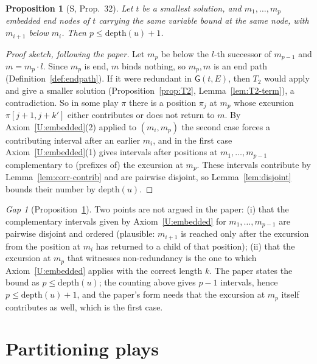 \documentclass[11pt]{article}
\newcommand{\depth}{\mathrm{depth}}
\newcommand{\Gm}{\mathsf{G}}
\newcommand{\suc}[2]{#1{\cdot}#2}
\newcommand{\iv}[2]{\pi[#1,#2]}
\theoremstyle{plain}
\newtheorem{proposition}[theorem]{Proposition}
\theoremstyle{definition}
\theoremstyle{remark}
\newtheorem{gap}{Gap}
\begin{document}
\begin{proposition}[S, Prop.~32]\label{prop:stacking}
Let $t$ be a smallest solution, and $m_1,\dots,m_p$ embedded end nodes of
$t$ carrying the same variable bound at the same node, with $m_{i+1}$
below $m_i$.  Then $p\le\depth(u)+1$.
\end{proposition}
\begin{proof}[Proof sketch, following the paper]
Let $m_p$ be below the $l$-th successor of $m_{p-1}$ and $m=\suc{m_p}l$.
Since $m_p$ is end, $m$ binds nothing, so $m_p,m$ is an end path
(Definition~\ref{def:endpath}).  If it were redundant in $\Gm(t,E)$, then
$T_2$ would apply and give a smaller solution
(Proposition~\ref{prop:T2}, Lemma~\ref{lem:T2-term}), a contradiction.
So in some play $\pi$ there is a position $\pi_j$ at $m_p$ whose
excursion $\iv{j+1}{j+k'}$ either contributes or does not return to $m$.
By Axiom~\ref{U:embedded}(2) applied to $(m_i,m_p)$ the second case
forces a contributing interval after an earlier $m_i$, and in the first
case Axiom~\ref{U:embedded}(1) gives intervals after positions at
$m_1,\dots,m_{p-1}$ complementary to (prefixes of) the excursion at
$m_p$.  These intervals contribute by Lemma~\ref{lem:corr-contrib} and
are pairwise disjoint, so Lemma~\ref{lem:disjoint} bounds their number by
$\depth(u)$.
\end{proof}

\begin{gap}[Proposition~\ref{prop:stacking}]\label{gap:stacking}
Two points are not argued in the paper: (i) that the complementary
intervals given by Axiom~\ref{U:embedded} for $m_1,\dots,m_{p-1}$ are
pairwise disjoint and ordered (plausible: $m_{i+1}$ is reached only
after the excursion from the position at $m_i$ has returned to a child
of that position); (ii) that the excursion at $m_p$ that witnesses
non-redundancy is the one to which Axiom~\ref{U:embedded} applies with
the correct length $k$.  The paper states the bound as $p\le\depth(u)$;
the counting above gives $p-1$ intervals, hence $p\le\depth(u)+1$, and
the paper's form needs that the excursion at $m_p$ itself contributes as
well, which is the first case.
\end{gap}

\section{Partitioning plays}
\end{document}
